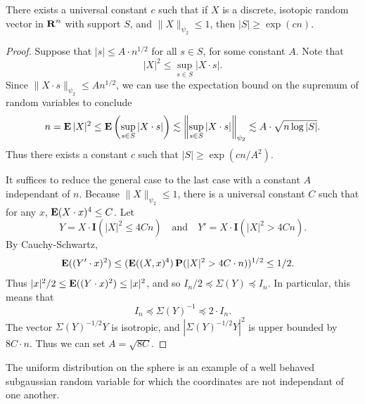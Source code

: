 \begin{theorem}
	There exists a universal constant $c$ such that if $X$ is a discrete, isotopic random vector in $\operatorname{\mathbf{R}}^n$ with support $S$, and $\| X \|_{\psi_2} \leq 1$, then $|S| \geq \exp(cn)$.
\end{theorem}
\begin{proof}
	Suppose that $|s| \leq A \cdot n^{1/2}$ for all $s \in S$, for some constant $A$. Note that
	\[ |X|^2 \leq \sup_{s \in S} |X \cdot s|. \]
	Since $\| X \cdot s \|_{\psi_2} \leq A n^{1/2}$, we can use the expectation bound on the supremum of random variables to conclude
	\[ n = \operatorname{\mathbf{E}} |X|^2 \leq \operatorname{\mathbf{E}} \left( \sup_{s \in S} |X \cdot s| \right) \lesssim \left\| \sup_{s \in S} |X \cdot s| \right\|_{\psi_2} \lesssim A \cdot \sqrt{n \log |S|}. \]
	Thus there exists a constant $c$ such that $|S| \geq \exp(cn/A^2)$.

	It suffices to reduce the general case to the last case with a constant $A$ independant of $n$. Because $\| X \|_{\psi_2} \leq 1$, there is a universal constant $C$ such that for any $x$, $\operatorname{\mathbf{E}} (X \cdot x)^4 \leq C$. Let
	\[ Y = X \cdot \mathbf{I}(|X|^2 \leq 4C n)\quad\text{and}\quad Y' = X \cdot \mathbf{I}(|X|^2 > 4 C n). \]
	By Cauchy-Schwartz,
	\begin{align*}
		\operatorname{\mathbf{E}}((Y' \cdot x)^2) &\leq (\operatorname{\mathbf{E}}((X,x)^4) \operatorname{\mathbf{P}}(|X|^2 > 4 C\cdot n) )^{1/2} \leq 1/2.
	\end{align*}
	Thus $|x|^2/2 \leq \operatorname{\mathbf{E}}((Y \cdot x)^2) \leq |x|^2$, and so $I_n / 2 \preceq \Sigma(Y) \preceq I_n$. In particular, this means that
	\[ I_n \preceq \Sigma(Y)^{-1} \preceq 2 \cdot I_n. \]
	The vector $\Sigma(Y)^{-1/2} Y$ is isotropic, and $|\Sigma(Y)^{-1/2} Y|^2$ is upper bounded by $8 C \cdot n$. Thus we can set $A = \sqrt{8C}$.
\end{proof}

The uniform distribution on the sphere is an example of a well behaved subgaussian random variable for which the coordinates are not independant of one another.


